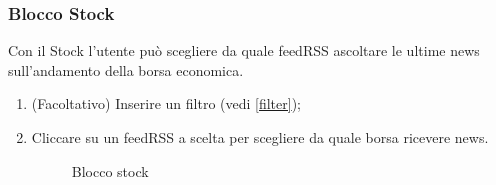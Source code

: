 \subsubsection{Blocco Stock}
Con il Stock l'utente può scegliere da quale feedRSS ascoltare le ultime news sull'andamento della borsa economica.
\begin{enumerate}
	\item (Facoltativo) Inserire un filtro (vedi \ref{filter});
	\item Cliccare su un feedRSS a scelta per scegliere da quale borsa ricevere news.
	\begin{figure}[!ht]
		\centering
		\caption{Blocco stock}
	\end{figure}
\end{enumerate}
\newpage
